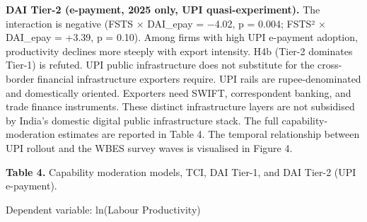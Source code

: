 \documentclass[
  12pt,a4paper]{article}
\begin{document}
\textbf{DAI Tier-2 (e-payment, 2025 only, UPI quasi-experiment).} The
interaction is negative (FSTS × DAI\_epay = −4.02, p = 0.004; FSTS² ×
DAI\_epay = +3.39, p = 0.10). Among firms with high UPI e-payment
adoption, productivity declines more steeply with export intensity. H4b
(Tier-2 dominates Tier-1) is refuted. UPI public infrastructure does not
substitute for the cross-border financial infrastructure exporters
require. UPI rails are rupee-denominated and domestically oriented.
Exporters need SWIFT, correspondent banking, and trade finance
instruments. These distinct infrastructure layers are not subsidised by
India's domestic digital public infrastructure stack. The full
capability-moderation estimates are reported in Table 4. The temporal
relationship between UPI rollout and the WBES survey waves is visualised
in Figure 4.

\textbf{Table 4.} Capability moderation models, TCI, DAI Tier-1, and DAI
Tier-2 (UPI e-payment).

Dependent variable: ln(Labour Productivity)
\end{document}
